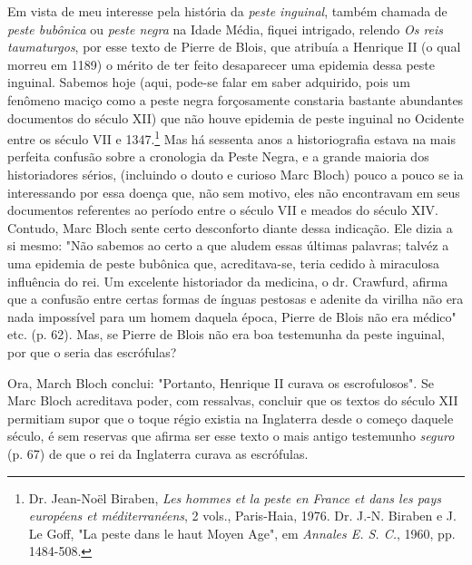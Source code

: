 \documentclass[a5paper]{book}
\begin{document}
Em vista de meu interesse pela história da \textit{peste inguinal}, também chamada de \textit{peste bubônica} ou \textit{peste negra} na Idade Média, f{\kern0pt}iquei intrigado, relendo \textit{Os reis taumaturgos}, por esse texto de Pierre de Blois, que atribuía a Henrique II (o qual morreu em 1189) o mérito de ter feito desaparecer uma epidemia dessa peste inguinal. Sabemos hoje (aqui, pode-se falar em saber adquirido, pois um fenômeno maciço como a peste negra forçosamente constaria bastante abundantes documentos do século XII) que não houve epidemia de peste inguinal no Ocidente entre os século VII e 1347.\footnote{Dr. Jean-Noël Biraben, \textit{Les hommes et la peste en France et dans les pays européens et méditerranéens}, 2 vols., Paris-Haia, 1976. Dr. J.-N. Biraben e J. Le Gof{\kern0pt}f, "La peste dans le haut Moyen Age", em \textit{Annales E. S. C.}, 1960, pp. 1484-508.} Mas há sessenta anos a historiograf{\kern0pt}ia estava na mais perfeita confusão sobre a cronologia da Peste Negra, e a grande maioria dos historiadores sérios, (incluindo o douto e curioso Marc Bloch) pouco a pouco se ia interessando por essa doença que, não sem motivo, eles não encontravam em seus documentos referentes ao período entre o século VII e meados do século XIV. Contudo, Marc Bloch sente certo desconforto diante dessa indicação. Ele dizia a si mesmo: "Não sabemos ao certo a que aludem essas últimas palavras; talvéz a uma epidemia de peste bubônica que, acreditava-se, teria cedido à miraculosa inf{\kern0pt}luência do rei. Um excelente historiador da medicina, o dr. Crawfurd, af{\kern0pt}irma que a confusão entre certas formas de ínguas pestosas e adenite da virilha não era nada impossível para um homem daquela época, Pierre de Blois não era médico" etc. (p. 62). Mas, se Pierre de Blois não era boa testemunha da peste inguinal, por que o seria das escrófulas?

Ora, March Bloch conclui: "Portanto, Henrique II curava os escrofulosos". Se Marc Bloch acreditava poder, com ressalvas, concluir que os textos do século XII permitiam supor que o toque régio existia na Inglaterra desde o começo daquele século, é sem reservas que af{\kern0pt}irma ser esse texto o mais antigo testemunho \textit{seguro} (p. 67) de que o rei da Inglaterra curava as escrófulas.
\end{document}
